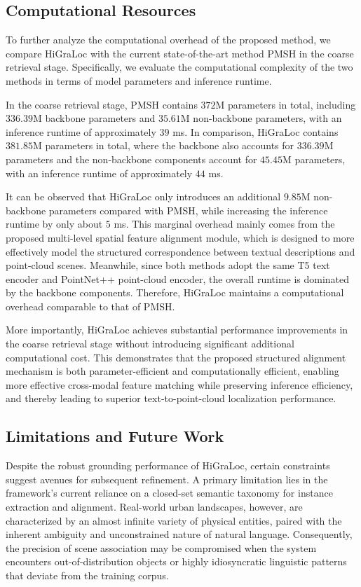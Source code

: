 \documentclass{article}
\begin{document}
\subsection{Computational Resources}
To further analyze the computational overhead of the proposed method, we compare HiGraLoc with the current state-of-the-art method PMSH in the coarse retrieval stage. Specifically, we evaluate the computational complexity of the two methods in terms of model parameters and inference runtime.

In the coarse retrieval stage, PMSH contains \(372\)M parameters in total, including \(336.39\)M backbone parameters and \(35.61\)M non-backbone parameters, with an inference runtime of approximately \(39\) ms. In comparison, HiGraLoc contains \(381.85\)M parameters in total, where the backbone also accounts for \(336.39\)M parameters and the non-backbone components account for \(45.45\)M parameters, with an inference runtime of approximately \(44\) ms.

It can be observed that HiGraLoc only introduces an additional \(9.85\)M non-backbone parameters compared with PMSH, while increasing the inference runtime by only about \(5\) ms. This marginal overhead mainly comes from the proposed multi-level spatial feature alignment module, which is designed to more effectively model the structured correspondence between textual descriptions and point-cloud scenes. Meanwhile, since both methods adopt the same T5 text encoder and PointNet++ point-cloud encoder, the overall runtime is dominated by the backbone components. Therefore, HiGraLoc maintains a computational overhead comparable to that of PMSH.

More importantly, HiGraLoc achieves substantial performance improvements in the coarse retrieval stage without introducing significant additional computational cost. This demonstrates that the proposed structured alignment mechanism is both parameter-efficient and computationally efficient, enabling more effective cross-modal feature matching while preserving inference efficiency, and thereby leading to superior text-to-point-cloud localization performance.

\subsection{Limitations and Future Work}
Despite the robust grounding performance of HiGraLoc, certain constraints suggest avenues for subsequent refinement. A primary limitation lies in the framework’s current reliance on a closed-set semantic taxonomy for instance extraction and alignment. Real-world urban landscapes, however, are characterized by an almost infinite variety of physical entities, paired with the inherent ambiguity and unconstrained nature of natural language. Consequently, the precision of scene association may be compromised when the system encounters out-of-distribution objects or highly idiosyncratic linguistic patterns that deviate from the training corpus.
\end{document}
